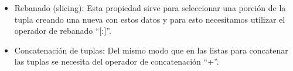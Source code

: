 \begin{itemize}
    \item Rebanado (slicing): Esta propiedad sirve para seleccionar una porción de la tupla creando una nueva con estos datos y para esto necesitamos utilizar el operador de rebanado ``[:]''.
    \begin{figure}[h]
        \centering
      \end{figure}
    
    \item Concatenación de tuplas: Del mismo modo que en las listas para concatenar las tuplas se necesita del operador de concatenación ``+''.
    \begin{figure}[h]
        \centering
      \end{figure}
    

\end{itemize}
